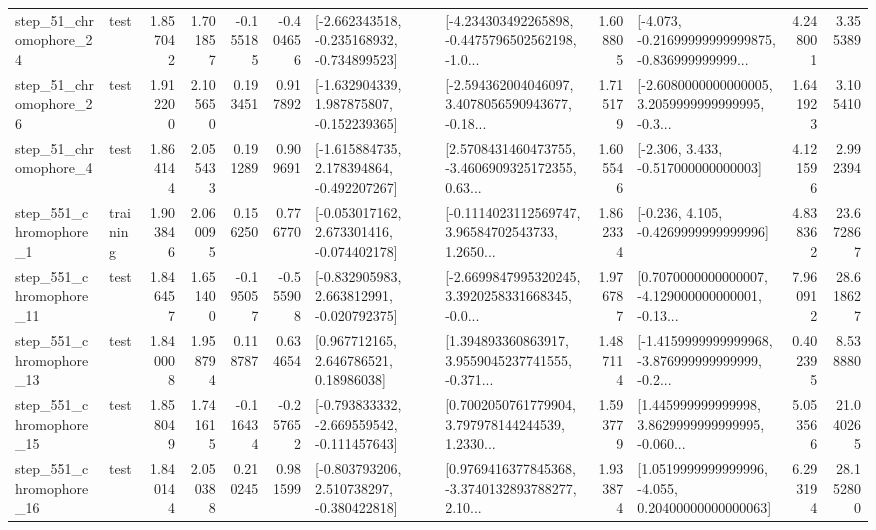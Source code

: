 \begin{tabular}{llrrrrllrlrr}
   step\_51\_chromophore\_24 &      test &      1.857042 &    1.701857 &     -0.155185 & -0.404656 &  [-2.662343518, -0.235168932, -0.734899523] &  [-4.234303492265898, -0.4475796502562198, -1.0... &       1.608805 &  [-4.073, -0.21699999999999875, -0.836999999999... &            4.248001 &          3.355389 \\
   step\_51\_chromophore\_26 &      test &      1.912200 &    2.105650 &      0.193451 &  0.917892 &   [-1.632904339, 1.987875807, -0.152239365] &  [-2.594362004046097, 3.4078056590943677, -0.18... &       1.715179 &  [-2.6080000000000005, 3.2059999999999995, -0.3... &            1.641923 &          3.105410 \\
    step\_51\_chromophore\_4 &      test &      1.864144 &    2.055433 &      0.191289 &  0.909691 &   [-1.615884735, 2.178394864, -0.492207267] &  [2.5708431460473755, -3.4606909325172355, 0.63... &       1.605546 &                [-2.306, 3.433, -0.517000000000003] &            4.121596 &          2.992394 \\
   step\_551\_chromophore\_1 &  training &      1.903846 &    2.060095 &      0.156250 &  0.776770 &   [-0.053017162, 2.673301416, -0.074402178] &  [-0.1114023112569747, 3.96584702543733, 1.2650... &       1.862334 &               [-0.236, 4.105, -0.4269999999999996] &            4.838362 &         23.672867 \\
  step\_551\_chromophore\_11 &      test &      1.846457 &    1.651400 &     -0.195057 & -0.555908 &   [-0.832905983, 2.663812991, -0.020792375] &  [-2.6699847995320245, 3.3920258331668345, -0.0... &       1.976787 &  [0.7070000000000007, -4.129000000000001, -0.13... &            7.960912 &         28.618627 \\
  step\_551\_chromophore\_13 &      test &      1.840008 &    1.958794 &      0.118787 &  0.634654 &      [0.967712165, 2.646786521, 0.18986038] &  [1.394893360863917, 3.9559045237741555, -0.371... &       1.487114 &  [-1.4159999999999968, -3.876999999999999, -0.2... &            0.402395 &          8.538880 \\
  step\_551\_chromophore\_15 &      test &      1.858049 &    1.741615 &     -0.116434 & -0.257652 &  [-0.793833332, -2.669559542, -0.111457643] &  [0.7002050761779904, 3.797978144244539, 1.2330... &       1.593779 &  [1.445999999999998, 3.8629999999999995, -0.060... &            5.053566 &         21.040265 \\
  step\_551\_chromophore\_16 &      test &      1.840144 &    2.050388 &      0.210245 &  0.981599 &   [-0.803793206, 2.510738297, -0.380422818] &  [0.9769416377845368, -3.3740132893788277, 2.10... &       1.933874 &  [1.0519999999999996, -4.055, 0.20400000000000063] &            6.293194 &         28.152800 \\

\end{tabular}
